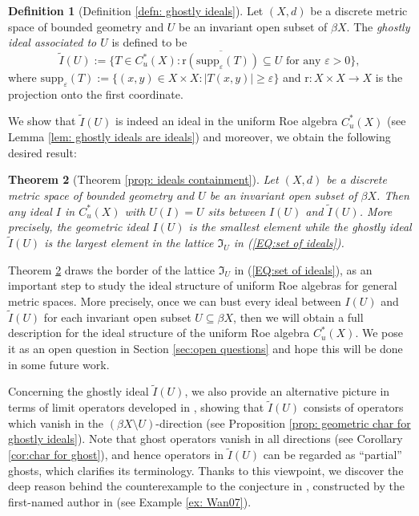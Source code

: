 \documentclass[12pt, a4paper]{amsart}
\numberwithin{equation}{section}
\newtheorem{alphthm}{Theorem}			%
\theoremstyle{definition}
\newtheorem{alphdefn}[alphthm]{Definition}			%
\theoremstyle{remark}
\def\supp{\mathrm{supp}}
\def\r{\mathrm{r}}
\begin{document}
\begin{alphdefn}[Definition \ref{defn: ghostly ideals}]\label{introdefn:ghostly ideals}
Let $(X, d)$ be a discrete metric space of bounded geometry and $U$ be an invariant open subset of $\beta X$. The \emph{ghostly ideal associated to $U$} is defined to be
\[
\tilde{I}(U):=\{T \in C^*_u(X): \overline{\r(\supp_\varepsilon(T))} \subseteq U \mbox{~for~any~}\varepsilon>0\},
\]
where $\supp_\varepsilon(T):=\{(x,y)\in X \times X: |T(x,y)| \geq \varepsilon\}$ and $\r: X \times X \to X$ is the projection onto the first coordinate.
\end{alphdefn}

We show that $\tilde{I}(U)$ is indeed an ideal in the uniform Roe algebra $C^*_u(X)$ (see Lemma \ref{lem: ghostly ideals are ideals}) and moreover, we obtain the following desired result:

\begin{alphthm}[Theorem \ref{prop: ideals containment}]\label{introthm:inclusion of ideals}
Let $(X,d)$ be a discrete metric space of bounded geometry and $U$ be an invariant open subset of $\beta X$. Then any ideal $I$ in $C^*_u(X)$ with $U(I)=U$ sits between $I(U)$ and $\tilde{I}(U)$. More precisely, the geometric ideal $I(U)$ is the smallest element while the ghostly ideal $\tilde{I}(U)$ is the largest element in the lattice $\mathfrak{I}_U$ in (\ref{EQ:set of ideals}).
\end{alphthm}

Theorem \ref{introthm:inclusion of ideals} draws the border of the lattice $\mathfrak{I}_U$ in (\ref{EQ:set of ideals}), as an important step to study the ideal structure of uniform Roe algebras for general metric spaces. More precisely, once we can bust every ideal between $I(U)$ and $\tilde{I}(U)$ for each invariant open subset $U \subseteq \beta X$, then we will obtain a full description for the ideal structure of the uniform Roe algebra $C^*_u(X)$. We pose it as an open question in Section \ref{sec:open questions} and hope this will be done in some future work.


Concerning the ghostly ideal $\tilde{I}(U)$, we also provide an alternative picture in terms of limit operators developed in \cite{SW17}, showing that $\tilde{I}(U)$ consists of operators which vanish in the $(\beta X \setminus U)$-direction (see Proposition \ref{prop: geometric char for ghostly ideals}). Note that ghost operators vanish in all directions (see Corollary \ref{cor:char for ghost}), and hence operators in $\tilde{I}(U)$ can be regarded as ``partial'' ghosts, which clarifies its terminology. Thanks to this viewpoint, we discover the deep reason behind the counterexample to the conjecture in \cite{CW04}, constructed by the first-named author in \cite[Section 3]{Wan07} (see Example \ref{ex: Wan07}).
\end{document}
